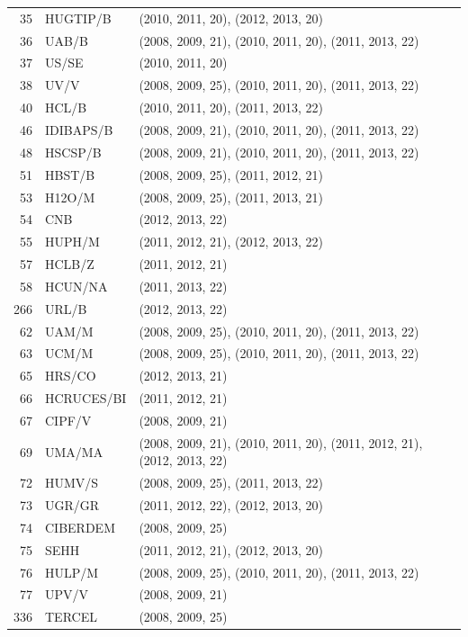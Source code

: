 \documentclass[a4paper,twoside,10pt]{article}
\begin{document}
\begin{center}
\begin{longtable}{rll}
 35 & HUGTIP/B    & (2010, 2011, 20), (2012, 2013, 20) \\
 36 & UAB/B       & (2008, 2009, 21), (2010, 2011, 20), (2011, 2013, 22) \\
 37 & US/SE       & (2010, 2011, 20) \\
 38 & UV/V        & (2008, 2009, 25), (2010, 2011, 20), (2011, 2013, 22) \\
 40 & HCL/B       & (2010, 2011, 20), (2011, 2013, 22) \\
 46 & IDIBAPS/B   & (2008, 2009, 21), (2010, 2011, 20), (2011, 2013, 22) \\
 48 & HSCSP/B     & (2008, 2009, 21), (2010, 2011, 20), (2011, 2013, 22) \\
 51 & HBST/B      & (2008, 2009, 25), (2011, 2012, 21) \\
 53 & H12O/M      & (2008, 2009, 25), (2011, 2013, 21) \\
 54 & CNB         & (2012, 2013, 22) \\
 55 & HUPH/M      & (2011, 2012, 21), (2012, 2013, 22) \\
 57 & HCLB/Z      & (2011, 2012, 21) \\
 58 & HCUN/NA     & (2011, 2013, 22) \\
266 & URL/B       & (2012, 2013, 22) \\
 62 & UAM/M       & (2008, 2009, 25), (2010, 2011, 20), (2011, 2013, 22) \\
 63 & UCM/M       & (2008, 2009, 25), (2010, 2011, 20), (2011, 2013, 22) \\
 65 & HRS/CO      & (2012, 2013, 21) \\
 66 & HCRUCES/BI  & (2011, 2012, 21) \\
 67 & CIPF/V      & (2008, 2009, 21) \\
 69 & UMA/MA      & (2008, 2009, 21), (2010, 2011, 20), (2011, 2012, 21), (2012, 2013, 22)\\
 72 & HUMV/S      & (2008, 2009, 25), (2011, 2013, 22) \\
 73 & UGR/GR      & (2011, 2012, 22), (2012, 2013, 20) \\
 74 & CIBERDEM    & (2008, 2009, 25) \\
 75 & SEHH        & (2011, 2012, 21), (2012, 2013, 20) \\
 76 & HULP/M      & (2008, 2009, 25), (2010, 2011, 20), (2011, 2013, 22) \\
 77 & UPV/V       & (2008, 2009, 21) \\
336 & TERCEL      & (2008, 2009, 25) \\

\end{longtable}
\end{center}
\end{document}
